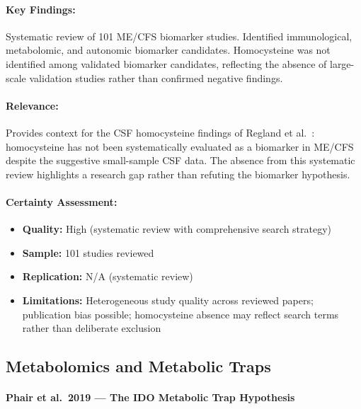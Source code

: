 \bigskip


\paragraph{Key Findings:}
Systematic review of 101 ME/CFS biomarker studies. Identified immunological, metabolomic,
and autonomic biomarker candidates. Homocysteine was not identified among validated biomarker
candidates, reflecting the absence of large-scale validation studies rather than confirmed
negative findings.

\paragraph{Relevance:}
Provides context for the CSF homocysteine findings of Regland et al.~\cite{Regland1997}:
homocysteine has not been systematically evaluated as a biomarker in ME/CFS despite the
suggestive small-sample CSF data. The absence from this systematic review highlights a
research gap rather than refuting the biomarker hypothesis.

\paragraph{Certainty Assessment:}
\begin{itemize}
  \item \textbf{Quality:} High (systematic review with comprehensive search strategy)
  \item \textbf{Sample:} 101 studies reviewed
  \item \textbf{Replication:} N/A (systematic review)
  \item \textbf{Limitations:} Heterogeneous study quality across reviewed papers;
    publication bias possible; homocysteine absence may reflect search terms rather than
    deliberate exclusion
\end{itemize}

\subsection{Metabolomics and Metabolic Traps}

\paragraph{Phair et al.\ 2019 --- The IDO Metabolic Trap Hypothesis}

\cite{phair2019ido}

